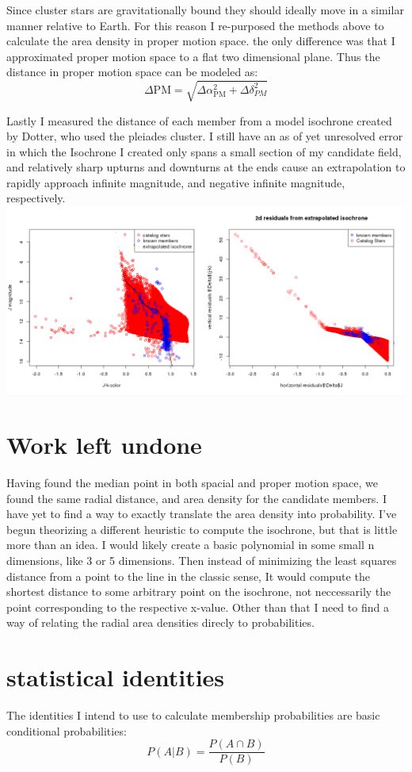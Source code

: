 \documentclass{article}
\begin{document}
\begin{multicols}{2}
Since cluster stars are gravitationally bound they should ideally move in a similar manner relative to Earth.  For this reason I re-purposed the methods above to calculate the area density in proper motion space. the only difference was that I approximated proper motion space to a flat two dimensional plane.  Thus the distance in proper motion space can be modeled as:
\begin{equation}
    \Delta\mathrm{PM}=\sqrt{\Delta\alpha_{\mathrm{PM}}^2+\Delta\delta_{PM}^2}
\end{equation}

Lastly I measured the distance of each member from a model isochrone created by Dotter, who used the pleiades cluster.  I still have an as of yet unresolved error in which the Isochrone I created only spans a small section of my candidate field, and relatively sharp upturns and downturns at the ends cause an extrapolation to rapidly approach infinite magnitude, and negative infinite magnitude, respectively.
\includegraphics[width=.5\textwidth]{isochroneB}
\section{Work left undone}

Having found the median point in both spacial and proper motion space, we found the same radial distance, and area density for the candidate members.  I have yet to find a way to exactly translate the area density into probability.  I've begun theorizing a different heuristic to compute the isochrone, but that is little more than an idea.  I would likely create a basic polynomial in some small n dimensions, like 3 or 5 dimensions.  Then instead of minimizing the least squares distance from a point to the line in the classic sense, It would compute the shortest distance to some arbitrary point on the isochrone, not neccessarily the point corresponding to the respective x-value. Other than that I need to find a way of relating the radial area densities direcly to probabilities.   

\section{statistical identities}
The identities I intend to use to calculate membership probabilities are basic conditional probabilities:
\begin{equation}
P(A|B)=\frac{P(A\cap B)}{P(B)}
\end{equation}


\end{multicols}
\end{document}
